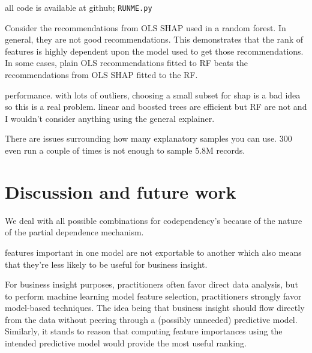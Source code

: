 \documentclass[11pt]{article}
\newcommand{\todo}[1]{{{\color{red}{[#1]}}}}
\begin{document}
all code is available at github; {\tt\small RUNME.py}

\todo{an experiment where we show insensitive to noise column and any other codependent ones that are thrown in but don't affect y}

\todo{what about outlier example}

\todo{stability is valuable. users would not trust results that changed significantly for small data set changes. show our error bars from bootstrapping and say we can do p-values.}

Consider the recommendations from OLS SHAP used in a random forest. In general, they are not good recommendations. This demonstrates that the rank of features is highly dependent upon the model used to get those recommendations. In some cases, plain OLS recommendations fitted to RF beats the recommendations from OLS SHAP fitted to the RF.

performance. with lots of outliers, choosing a small subset for shap is a bad idea so this is a real problem. linear and boosted trees are efficient but RF are not and I wouldn't consider anything using the general explainer.

There are issues surrounding how many explanatory samples you can use. 300 even run a couple of times is not enough to sample 5.8M records.

\todo{We need min samples per x to avoid left edge issues as they skew entire pdp, which severely skews mass AUC.}

\todo{explain cat mechanism and how there is no left/right edge so no evidence used to weight AUC.}
 
\section{Discussion and future work}

We deal with all possible combinations for codependency's because of the nature of the partial dependence mechanism.

features important in one model are not exportable to another which also means that they're less likely to be useful for business insight.
 
For business insight purposes, practitioners often favor direct data analysis, but to perform machine learning model feature selection, practitioners strongly favor model-based techniques. The idea being that business insight should flow directly from the data without peering through a (possibly unneeded) predictive model.  Similarly, it stands to reason that computing feature importances using the intended predictive model would provide the most useful ranking.
\end{document}
